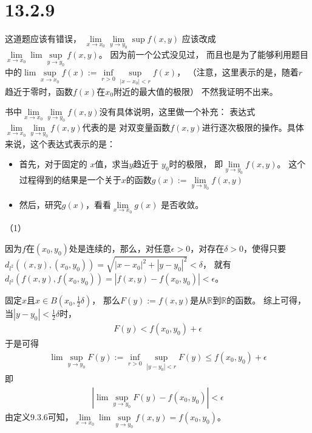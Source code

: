 \documentclass{article}
\begin{document}
\section*{13.2.9}

\begin{zremark}
  这道题应该有错误，
  $\lim\limits_{x \to x_0}\lim\limits_{y \to y_0}\sup f(x, y)$
  应该改成
  $\lim \limits_{x \to x_0}\lim \sup \limits_{y \to y_0}f(x, y)$。
  因为前一个公式没见过，
  而且也是为了能够利用题目中的$\lim \sup \limits_{x \to x_0}f(x) := \inf \limits_{r > 0} \sup \limits_{|x - x_0| < r} f(x)$，
  （注意，这里表示的是，随着$r$趋近于零时，函数$f(x)$在$x_0$附近的最大值的极限）
  不然我证明不出来。
\end{zremark}
\begin{zremark}
  书中$\lim\limits_{x \to x_0}\lim\limits_{y \to y_0}f(x, y)$没有具体说明，这里做一个补充：
  表达式$\lim\limits_{x \to x_0}\lim\limits_{y \to y_0}f(x, y)$代表的是
  对双变量函数$f(x,y)$进行逐次极限的操作。具体来说，这个表达式表示的是：
  \begin{itemize}
    \item 首先，对于固定的
          $x$值，求当$y$趋近于 $y_0$时的极限，
          即$\lim\limits_{y \to y_0}f(x,y)$。
          这个过程得到的结果是一个关于$x$的函数$g(x) := \lim\limits_{y \to y_0}f(x,y)$

    \item 然后，研究$g(x)$，看看$\lim\limits_{x \to x_0} g(x)$ 是否收敛。
  \end{itemize}
\end{zremark}

（1）

因为$f$在$(x_0, y_0)$处是连续的，那么，对任意$\epsilon > 0$，对存在$\delta > 0$，使得只要
$d_{l^2}((x, y), (x_0, y_0)) = \sqrt{|x - x_0|^2 + |y - y_0|^2} < \delta$，
就有$d_{l^2}(f(x, y), f(x_0, y_0)) = |f(x, y) - f(x_0, y_0)| < \epsilon$。

固定$x$且$x \in B(x_0, \frac{1}{2}\delta)$，
那么$F(y) := f(x, y)$是从$\mathbb{R}$到$\mathbb{R}$的函数。
综上可得，当$|y - y_0| < \frac{1}{2}\delta$时，
\begin{align*}
  F(y) < f(x_0, y_0) + \epsilon
\end{align*}
于是可得
\begin{align*}
  \lim \sup \limits_{y \to y_0}F(y) := \inf \limits_{r > 0} \sup \limits_{|y - y_0| < r} F(y) \leq f(x_0, y_0) + \epsilon
\end{align*}
即
\begin{align*}
  |\lim \sup \limits_{y \to y_0}F(y) - f(x_0, y_0)| < \epsilon
\end{align*}
由定义9.3.6可知，$\lim \limits_{x \to x_0}\lim \sup \limits_{y \to y_0}f(x, y) = f(x_0, y_0)$。
\end{document}
